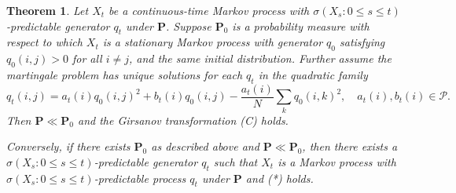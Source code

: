\documentclass{lms}
\newtheorem{theorem}{Theorem}[section] %
\begin{document}
\begin{theorem}
Let \(X_t\) be a continuous-time Markov process with $\sigma(X_s:0 \le s \le t)$-predictable generator \(q_t\) under \(\mathbf{P}\). Suppose \(\mathbf{P}_0\) is a probability measure with respect to which \(X_t\) is a stationary Markov process with generator \(q_0\) satisfying \(q_0(i,j) > 0\) for all \(i \neq j\), and the same initial distribution. Further assume the martingale problem has unique solutions for each $q_t$ in the quadratic family
\[q_t(i,j) = a_t(i) q_0(i,j)^2 + b_t(i) q_0(i,j) - \frac{a_t(i)}{N} \sum_k q_0(i,k)^2, \quad a_t(i),b_t(i) \in \mathcal P.\]
Then \(\mathbf{P} \ll \mathbf{P}_0\) and the Girsanov transformation (C) holds.

Conversely, if there exists \(\mathbf{P}_0\) as described above and \(\mathbf{P} \ll \mathbf{P}_0\), then there exists a $\sigma(X_s:0 \le s \le t)$-predictable generator \(q_t\) such that \(X_t\) is a Markov process with $\sigma(X_s:0 \le s \le t)$-predictable process \(q_t\) under \(\mathbf{P}\) and (*) holds.
\end{theorem}
\end{document}

